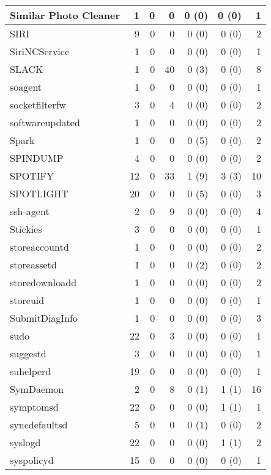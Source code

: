 \begin{adjustwidth}{-2in}{}
\begin{scriptsize}
\begin{longtable}[l]{ l | r | r | r | r | r | r }
    Similar Photo Cleaner &  1 &  0 &  0 &  0 (0) &  0 (0) &  1 \\ \hline
    SIRI & 9 &  0 &  0 &  0 (0) &  0 (0) &  2 \\ \hline
    SiriNCService &  1 &  0 &  0 &  0 (0) &  0 (0) &  1 \\ \hline
    SLACK &  1 &  0 & 40 &  0 (3) &  0 (0) &  8 \\ \hline
    soagent &  1 &  0 &  0 &  0 (0) &  0 (0) &  1 \\ \hline
    socketfilterfw & 3 &  0 &  4 &  0 (0) &  0 (0) &  2 \\ \hline
    softwareupdated &  1 &  0 &  0 &  0 (0) &  0 (0) &  2 \\ \hline
    Spark &  1 &  0 &  0 &  0 (5) &  0 (0) &  2 \\ \hline
    SPINDUMP & 4 &  0 &  0 &  0 (0) &  0 (0) &  2 \\ \hline
    SPOTIFY & 12 &  0 & 33 &  1 (9) &  3 (3) & 10 \\ \hline
    SPOTLIGHT & 20 &  0 &  0 &  0 (5) &  0 (0) &  3 \\ \hline
    ssh-agent &  2 &  0 &  9 &  0 (0) &  0 (0) &  4 \\ \hline
    Stickies & 3 &  0 &  0 &  0 (0) &  0 (0) &  1 \\ \hline
    storeaccountd &  1 &  0 &  0 &  0 (0) &  0 (0) &  2 \\ \hline
    storeassetd &  1 &  0 &  0 &  0 (2) &  0 (0) &  2 \\ \hline
    storedownloadd & 1 &  0 &  0 &  0 (0) &  0 (0) &  2 \\ \hline
    storeuid & 1 &  0 &  0 &  0 (0) &  0 (0) &  1 \\ \hline
    SubmitDiagInfo & 1 &  0 &  0 &  0 (0) &  0 (0) &  3 \\ \hline
    sudo &  22 &  0 &  3 &  0 (0) &  0 (0) &  1 \\ \hline
    suggestd & 3 &  0 &  0 &  0 (0) &  0 (0) &  1 \\ \hline
    suhelperd & 19 &  0 &  0 &  0 (0) &  0 (0) &  1 \\ \hline
    SymDaemon &  2 &  0 &  8 &  0 (1) &  1 (1) & 16 \\ \hline
    symptomsd & 22 &  0 &  0 &  0 (0) &  1 (1) &  1 \\ \hline
    syncdefaultsd &  5 &  0 &  0 &  0 (1) &  0 (0) &  2 \\ \hline
    syslogd & 22 &  0 &  0 &  0 (0) &  1 (1) &  2 \\ \hline
    syspolicyd &  15 &  0 &  0 &  0 (0) &  0 (0) &  1 \\ \hline

\end{longtable}
\end{scriptsize}
\end{adjustwidth}
